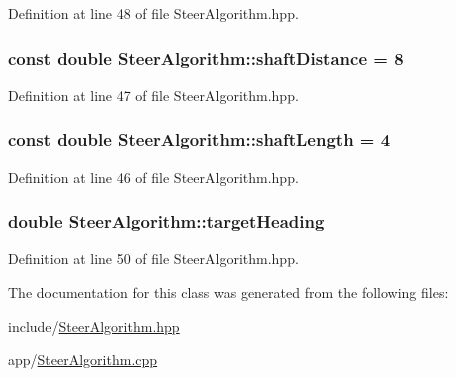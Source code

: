 Definition at line 48 of file Steer\+Algorithm.\+hpp.

\subsubsection[{\texorpdfstring{shaft\+Distance}{shaftDistance}}]{\setlength{\rightskip}{0pt plus 5cm}const double Steer\+Algorithm\+::shaft\+Distance = 8}\hypertarget{class_steer_algorithm_a38bc87552a30e8eda8f647cf341c9657}{}\label{class_steer_algorithm_a38bc87552a30e8eda8f647cf341c9657}


Definition at line 47 of file Steer\+Algorithm.\+hpp.

\subsubsection[{\texorpdfstring{shaft\+Length}{shaftLength}}]{\setlength{\rightskip}{0pt plus 5cm}const double Steer\+Algorithm\+::shaft\+Length = 4}\hypertarget{class_steer_algorithm_a9d5bc20acba39f0e53c3d0f6fc280433}{}\label{class_steer_algorithm_a9d5bc20acba39f0e53c3d0f6fc280433}


Definition at line 46 of file Steer\+Algorithm.\+hpp.

\subsubsection[{\texorpdfstring{target\+Heading}{targetHeading}}]{\setlength{\rightskip}{0pt plus 5cm}double Steer\+Algorithm\+::target\+Heading}\hypertarget{class_steer_algorithm_a071efeb53e86ee949940b0ab10986044}{}\label{class_steer_algorithm_a071efeb53e86ee949940b0ab10986044}


Definition at line 50 of file Steer\+Algorithm.\+hpp.



The documentation for this class was generated from the following files\+:\begin{DoxyCompactItemize}
\item 
include/\hyperlink{_steer_algorithm_8hpp}{Steer\+Algorithm.\+hpp}\item 
app/\hyperlink{_steer_algorithm_8cpp}{Steer\+Algorithm.\+cpp}\end{DoxyCompactItemize}
